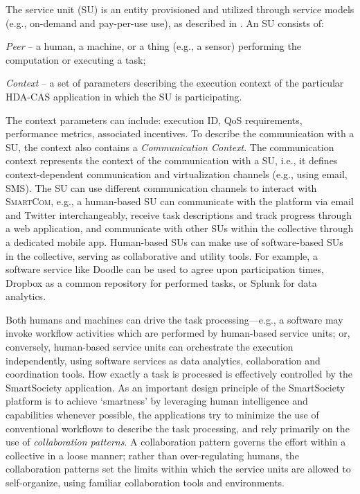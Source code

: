 \documentclass{llncs}
\newcommand{\mdl}{\textsc{SmartCom}}
\begin{document}
      The service unit (SU) is an entity provisioned and utilized through service models (e.g., on-demand and pay-per-use use), as described in \cite{truongijcis}. An SU consists of:
        \begin{inparaenum}[\itshape i)]
          \item \textit{Peer} -- a human, a machine, or a thing (e.g., a sensor) performing the computation or executing a task;
          \item \textit{Context} -- a set of parameters describing the execution context of the particular HDA-CAS application in which the SU is participating. 
        \end{inparaenum}
      The context parameters can include: execution ID, QoS requirements, performance metrics, associated incentives. 
	  To describe the communication with a SU, the context also contains a \emph{Communication Context}. The communication context represents the context of the communication with a SU, i.e., it defines context-dependent communication and virtualization channels (e.g., using email, SMS).
      The SU can use different communication channels to interact with \mdl{}, e.g., a human-based SU can communicate with the platform via email and Twitter interchangeably, receive task descriptions and track progress through a web application, and communicate with other SUs within the collective through a dedicated mobile app. Human-based SUs can make use of software-based SUs in the collective, serving as collaborative and utility tools. For example, a software service like Doodle can be used to agree upon participation times, Dropbox as a common repository for performed tasks, or Splunk for data analytics.

      Both humans and machines can drive the task processing---e.g., a software may invoke workflow activities which are performed by  human-based service units; or, conversely, human-based service units can orchestrate the execution independently, using software services as data analytics, collaboration and coordination tools.
      How exactly a task is processed is effectively controlled by the SmartSociety application.  As an important design principle of the SmartSociety platform is to achieve `smartness' by leveraging human intelligence and capabilities whenever possible, the applications try to minimize the use of conventional workflows to describe the task processing, and rely primarily on the use of \emph{collaboration patterns}. 
      A collaboration pattern governs the effort within a collective in a loose manner; rather than over-regulating humans, the collaboration patterns set the limits within which the service units are allowed to self-organize, using familiar collaboration tools and environments. 
      
\end{document}
